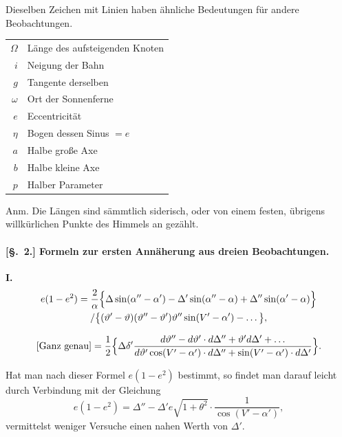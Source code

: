 \documentclass[12pt,a4paper]{article}
\theoremstyle{plain}
\theoremstyle{definition}
\theoremstyle{remark}
\begin{document}
\medskip

Dieselben Zeichen mit Linien haben ähnliche Bedeutungen für andere Beobachtungen.

\begin{center}
\begin{tabular}{r@{\quad}p{8cm}}
$\Omega$ & Länge des aufsteigenden Knoten \\
$i$ & Neigung der Bahn \\
$g$ & Tangente derselben \\
$\omega$ & Ort der Sonnenferne \\
$e$ & Eccentricität \\
$\eta$ & Bogen dessen Sinus $= e$ \\
$a$ & Halbe große Axe \\
$b$ & Halbe kleine Axe \\
$p$ & Halber Parameter
\end{tabular}
\end{center}

Anm. Die Längen sind sämmtlich siderisch, oder von einem festen, übrigens willkürlichen Punkte des Himmels an gezählt.

\newpage

\paragraph{[§.~2.] Formeln zur ersten Annäherung aus dreien Beobachtungen.}

\textbf{I.}
\begin{multline*}
e(1 - e^2) = \frac{2}{\alpha}\Bigl\{\Delta \sin(\alpha'' - \alpha') - \Delta' \sin(\alpha'' - \alpha) + \Delta'' \sin(\alpha' - \alpha)\Bigr\} \\
/ \bigl\{(\vartheta' - \vartheta)(\vartheta'' - \vartheta')\vartheta'' \sin(V' - \alpha') - \dots\bigr\},
\end{multline*}

\begin{multline*}
\text{[Ganz genau]} = \frac{1}{2}\Bigl\{\Delta \delta' \frac{d\vartheta'' - d\vartheta' \cdot d\Delta'' + \vartheta' d\Delta' + \dots}{d\vartheta' \cos(V' - \alpha') \cdot d\Delta'' + \sin(V' - \alpha') \cdot d\Delta'}\Bigr\}.
\end{multline*}

Hat man nach dieser Formel $e(1 - e^2)$ bestimmt, so findet man darauf leicht durch Verbindung mit der Gleichung
\[
e(1 - e^2) = \Delta'' - \Delta' e \sqrt{1 + \theta^2} \cdot \frac{1}{\cos(V' - \alpha')},
\]
vermittelst weniger Versuche einen nahen Werth von $\Delta'$.
\end{document}
